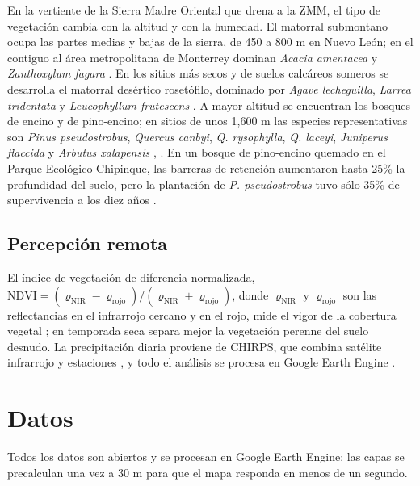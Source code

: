 En la vertiente de la Sierra Madre Oriental que drena a la ZMM, el tipo de vegetación cambia con la altitud y con la humedad. El matorral submontano ocupa las partes medias y bajas de la sierra, de 450 a 800 m en Nuevo León; en el contiguo al área metropolitana de Monterrey dominan \emph{Acacia amentacea} y \emph{Zanthoxylum fagara} . En los sitios más secos y de suelos calcáreos someros se desarrolla el matorral desértico rosetófilo, dominado por \emph{Agave lecheguilla}, \emph{Larrea tridentata} y \emph{Leucophyllum frutescens} . A mayor altitud se encuentran los bosques de encino y de pino-encino; en sitios de unos 1,600 m las especies representativas son \emph{Pinus pseudostrobus}, \emph{Quercus canbyi}, \emph{Q. rysophylla}, \emph{Q. laceyi}, \emph{Juniperus flaccida} y \emph{Arbutus xalapensis} , . En un bosque de pino-encino quemado en el Parque Ecológico Chipinque, las barreras de retención aumentaron hasta 25\% la profundidad del suelo, pero la plantación de \emph{P. pseudostrobus} tuvo sólo 35\% de supervivencia a los diez años .

\subsection{Percepción remota}

El índice de vegetación de diferencia normalizada, $\text{NDVI}=(\varrho_{\text{NIR}}-\varrho_{\text{rojo}})/(\varrho_{\text{NIR}}+\varrho_{\text{rojo}})$, donde $\varrho_{\text{NIR}}$ y $\varrho_{\text{rojo}}$ son las reflectancias en el infrarrojo cercano y en el rojo, mide el vigor de la cobertura vegetal ; en temporada seca separa mejor la vegetación perenne del suelo desnudo. La precipitación diaria proviene de CHIRPS, que combina satélite infrarrojo y estaciones , y todo el análisis se procesa en Google Earth Engine .

\section{Datos}

Todos los datos son abiertos y se procesan en Google Earth Engine; las capas se precalculan una vez a 30 m para que el mapa responda en menos de un segundo.


